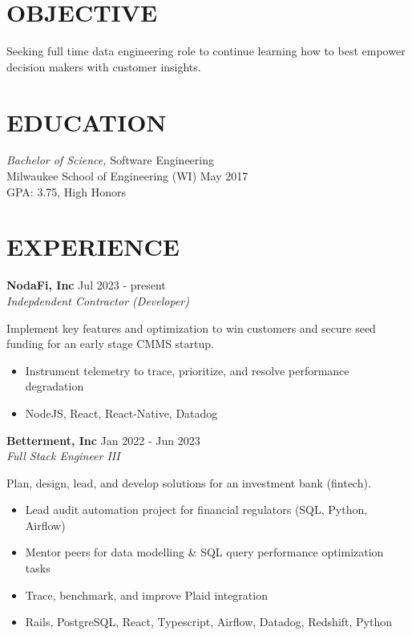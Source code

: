 \documentclass[line,margin]{res}
\begin{document}

\address{austin.dev@protonmail.com | (414) 334-4061}

\begin{resume}

\section{OBJECTIVE}
Seeking full time data engineering role to continue learning how to best empower decision makers with customer insights.

\section{EDUCATION}
{\sl Bachelor of Science,} Software Engineering \\
Milwaukee School of Engineering (WI) \hfill May 2017 \\
GPA: 3.75, High Honors \\

\section{EXPERIENCE}

\textbf{NodaFi, Inc} \hfill Jul 2023 - present \\
{\sl Indepdendent Contractor (Developer)}

Implement key features and optimization to win customers and secure seed funding for an early stage CMMS startup.

\begin{itemize}
\item Instrument telemetry to trace, prioritize, and resolve performance degradation
\item NodeJS, React, React-Native, Datadog
\end{itemize}

\textbf{Betterment, Inc} \hfill Jan 2022 - Jun 2023 \\
{\sl Full Stack Engineer III}

Plan, design, lead, and develop solutions for an investment bank (fintech).

\begin{itemize}
\item Lead audit automation project for financial regulators (SQL, Python, Airflow)
\item Mentor peers for data modelling \& SQL query performance optimization tasks
\item Trace, benchmark, and improve Plaid integration
\item Rails, PostgreSQL, React, Typescript, Airflow, Datadog, Redshift, Python
\end{itemize}


\end{resume}
\end{document}
